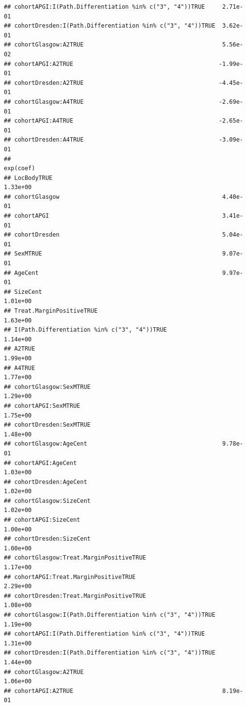 \documentclass{article}\usepackage[]{graphicx}\usepackage[]{color}
\makeatletter
\newenvironment{kframe}{%
 \def\at@end@of@kframe{}%
 \ifinner\ifhmode%
  \def\at@end@of@kframe{\end{minipage}}%
  \begin{minipage}{\columnwidth}%
 \fi\fi%
 \def\FrameCommand##1{\hskip\@totalleftmargin \hskip-\fboxsep
 \colorbox{shadecolor}{##1}\hskip-\fboxsep
     \hskip-\linewidth \hskip-\@totalleftmargin \hskip\columnwidth}%
 \MakeFramed {\advance\hsize-\width
   \@totalleftmargin\z@ \linewidth\hsize
   \@setminipage}}%
 {\par\unskip\endMakeFramed%
 \at@end@of@kframe}
\newenvironment{knitrout}{}{} %
\makeatother
\begin{document}
\begin{knitrout}
\begin{kframe}
\begin{verbatim}
## cohortAPGI:I(Path.Differentiation %in% c("3", "4"))TRUE     2.71e-01
## cohortDresden:I(Path.Differentiation %in% c("3", "4"))TRUE  3.62e-01
## cohortGlasgow:A2TRUE                                        5.56e-02
## cohortAPGI:A2TRUE                                          -1.99e-01
## cohortDresden:A2TRUE                                       -4.45e-01
## cohortGlasgow:A4TRUE                                       -2.69e-01
## cohortAPGI:A4TRUE                                          -2.65e-01
## cohortDresden:A4TRUE                                       -3.09e-01
##                                                            exp(coef)
## LocBodyTRUE                                                 1.33e+00
## cohortGlasgow                                               4.40e-01
## cohortAPGI                                                  3.41e-01
## cohortDresden                                               5.04e-01
## SexMTRUE                                                    9.07e-01
## AgeCent                                                     9.97e-01
## SizeCent                                                    1.01e+00
## Treat.MarginPositiveTRUE                                    1.63e+00
## I(Path.Differentiation %in% c("3", "4"))TRUE                1.14e+00
## A2TRUE                                                      1.99e+00
## A4TRUE                                                      1.77e+00
## cohortGlasgow:SexMTRUE                                      1.29e+00
## cohortAPGI:SexMTRUE                                         1.75e+00
## cohortDresden:SexMTRUE                                      1.48e+00
## cohortGlasgow:AgeCent                                       9.78e-01
## cohortAPGI:AgeCent                                          1.03e+00
## cohortDresden:AgeCent                                       1.02e+00
## cohortGlasgow:SizeCent                                      1.02e+00
## cohortAPGI:SizeCent                                         1.00e+00
## cohortDresden:SizeCent                                      1.00e+00
## cohortGlasgow:Treat.MarginPositiveTRUE                      1.17e+00
## cohortAPGI:Treat.MarginPositiveTRUE                         2.29e+00
## cohortDresden:Treat.MarginPositiveTRUE                      1.08e+00
## cohortGlasgow:I(Path.Differentiation %in% c("3", "4"))TRUE  1.19e+00
## cohortAPGI:I(Path.Differentiation %in% c("3", "4"))TRUE     1.31e+00
## cohortDresden:I(Path.Differentiation %in% c("3", "4"))TRUE  1.44e+00
## cohortGlasgow:A2TRUE                                        1.06e+00
## cohortAPGI:A2TRUE                                           8.19e-01

\end{verbatim}
\end{kframe}
\end{knitrout}
\end{document}
